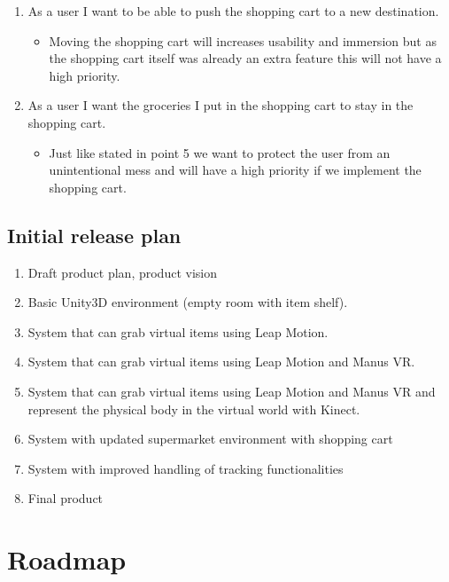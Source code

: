 \documentclass[11pt,a4paper]{report}
\begin{document}
\begin{enumerate}
\item As a user I want to be able to push the shopping cart to a new destination.
\begin{itemize}
\item Moving the shopping cart will increases usability and immersion but as the shopping cart itself was already an extra feature this will not have a high priority.
\end{itemize}
\item As a user I want the groceries I put in the shopping cart to stay in the shopping cart.
\begin{itemize}
\item Just like stated in point 5 we want to protect the user from an unintentional mess and will have a high priority if we implement the shopping cart.  
\end{itemize}
\end{enumerate}

\section{Initial release plan}
\begin{enumerate}[label=\large{ \textbf{Sprint \arabic*}},leftmargin=3\parindent]
\item Draft product plan, product vision
\item Basic Unity3D environment (empty room with item shelf).
\item System that can grab virtual items using Leap Motion.
\item System that can grab virtual items using Leap Motion and Manus VR.
\item System that can grab virtual items using Leap Motion and Manus VR and represent the physical body in the virtual world with Kinect.
\item System with updated supermarket environment with shopping cart
\item System with improved handling of tracking functionalities
\item Final product
\end{enumerate}

\chapter{Roadmap}
\end{document}
